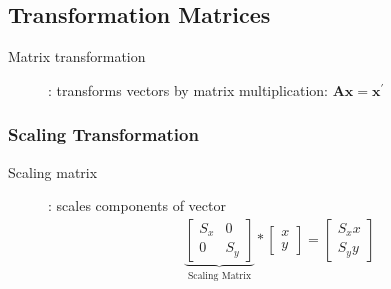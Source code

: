 \documentclass[letterpaper,12pt]{article}
\newcommand{\vect}[1]{\mathbf{#1}}
\newcommand{\matr}[1]{\mathbf{#1}}
\begin{document}
\subsection{Transformation Matrices}
\begin{description}
 \item[Matrix transformation]: transforms vectors by matrix multiplication: $\matr{A}\vect{x} = \vect{x}^{\prime}$
\end{description}

\subsubsection{Scaling Transformation}
\begin{description}
 \item[Scaling matrix]: scales components of vector
       \begin{align}
        \underbrace{\begin{bmatrix}
          S_x & 0   \\
          0   & S_y
         \end{bmatrix}}_\text{Scaling Matrix}
        * \begin{bmatrix}
         x \\
         y
        \end{bmatrix}
        = \begin{bmatrix}
         S_x x \\
         S_y y
        \end{bmatrix}
       \end{align}
\end{description}
\end{document}
